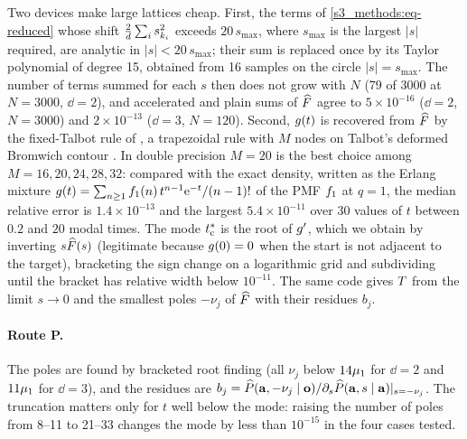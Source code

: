 Two devices make large lattices cheap. First, the terms of \eqref{s3_methods:eq-reduced} whose shift
$\frac{2}{d}\sum_is_{k_i}^{2}$ exceeds $20\,s_{\max}$, where $s_{\max}$ is the largest $|s|$ required, are analytic
in $|s|<20\,s_{\max}$; their sum is replaced once by its Taylor polynomial of degree 15, obtained from 16 samples on
the circle $|s|=s_{\max}$. The number of terms summed for each $s$ then does not grow with $N$ (79 of 3000 at
$N=3000$, $\dd=2$), and accelerated and plain sums of $\widehat{F}$ agree to $5\times10^{-16}$ ($\dd=2$, $N=3000$) and
$2\times10^{-13}$ ($\dd=3$, $N=120$).
Second, $g(t)$ is recovered from $\widehat{F}$ by the fixed-Talbot rule of \citet{AbateValko2004}, a trapezoidal rule
with $M$ nodes on Talbot's deformed Bromwich contour \citep{Talbot1979,Weideman2006}. In double precision $M=20$ is the
best choice among $M=16,20,24,28,32$: compared with the exact density, written as the Erlang mixture
$g(t)=\sum_{n\ge1}f_{1}(n)\,t^{n-1}\mathrm{e}^{-t}/(n-1)!$ of the PMF $f_1$ at $q=1$, the median relative error is
$1.4\times10^{-13}$ and the largest $5.4\times10^{-11}$ over 30 values of $t$ between $0.2$ and $20$ modal times.
The mode $t^{*}_{\mathrm{c}}$ is the root of $g'$, which we obtain by inverting $s\widehat{F}(s)$ (legitimate because $g(0)=0$ when
the start is not adjacent to the target), bracketing the sign change on a logarithmic grid and subdividing until the
bracket has relative width below $10^{-11}$. The same code gives $T$ from the limit $s\to0$ and the smallest poles
$-\nu_j$ of $\widehat{F}$ with their residues $b_j$.

\paragraph{Route P.} The poles are found by bracketed root finding (all $\nu_j$ below $14\mu_{1}$ for $\dd=2$ and
$11\mu_{1}$ for $\dd=3$), and the residues are $b_j=\widehat{P}(\mathbf{a},-\nu_j\mid\mathbf{o})/\partial_s\widehat{P}(\mathbf{a},s\mid\mathbf{a})|_{s=-\nu_j}$.
The truncation matters only for $t$ well below the mode: raising the number of poles from 8--11 to 21--33 changes the
mode by less than $10^{-15}$ in the four cases tested.

